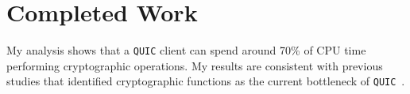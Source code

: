 \documentclass[12pt,a4paper,twoside,openright]{report}
\begin{document}



\section{Completed Work}
My analysis shows that a \texttt{QUIC} client can spend around 70\% of CPU time performing cryptographic operations. 
My results are consistent with previous studies that identified cryptographic functions as the current bottleneck of \texttt{QUIC}~\cite{Making_QUIC_Quicker}.


















\end{document}
